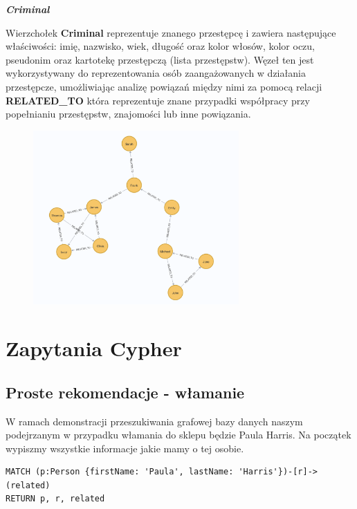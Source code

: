 \documentclass[a4paper,12pt]{article}
\begin{document}
\begin{center} 
    \textbf{\textit{Criminal}} 
\end{center}

Wierzchołek \textbf{Criminal} reprezentuje znanego przestępcę i zawiera następujące właściwości: imię, nazwisko, wiek, długość oraz kolor włosów, kolor oczu, pseudonim oraz kartotekę przestępczą (lista przestępstw). Węzeł ten jest wykorzystywany do reprezentowania osób zaangażowanych w działania przestępcze, umożliwiając analizę powiązań między nimi za pomocą relacji \textbf{RELATED\_TO} która reprezentuje znane przypadki współpracy przy popełnianiu przestępstw, znajomości lub inne powiązania.

\begin{figure}[h!]
    \centering
    \includegraphics[width=0.7\textwidth]{relations.png} 
\end{figure}

\section{Zapytania Cypher}

\subsection{Proste rekomendacje - włamanie}

W ramach demonstracji przeszukiwania grafowej bazy danych naszym podejrzanym w przypadku włamania do sklepu będzie Paula Harris. Na początek wypiszmy wszystkie informacje jakie mamy o tej osobie.

\begin{center}
\begin{minipage}{0.8\linewidth}
\begin{lstlisting}[language=Cypher, basicstyle=\small, breaklines=true]
MATCH (p:Person {firstName: 'Paula', lastName: 'Harris'})-[r]->(related)
RETURN p, r, related
\end{lstlisting}
\end{minipage}
\end{center}
\end{document}
